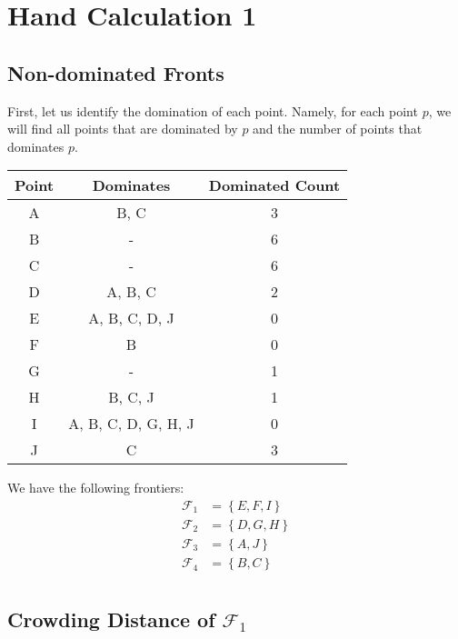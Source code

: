 \section{Hand Calculation 1}

\subsection{Non-dominated Fronts}
First, let us identify the domination of each point. Namely, for each point \(p\), we will find all points that are dominated by \(p\) and the number of points that dominates \(p\).

\begin{table}[ht]
    \centering
    \begin{tabular}{ccc}
        \toprule
        \textbf{Point} & \textbf{Dominates} & \textbf{Dominated Count} \\
        \midrule
        A & B, C & 3 \\
        B & - & 6 \\
        C & - & 6 \\
        D & A, B, C & 2\\
        E & A, B, C, D, J & 0 \\
        F & B & 0 \\
        G & - & 1 \\
        H & B, C, J & 1 \\
        I & A, B, C, D, G, H, J & 0 \\
        J & C & 3 \\
        \bottomrule
    \end{tabular}
\end{table}


We have the following frontiers:
\[
\begin{aligned}
    \mathcal{F}_1 &= \left\{E, F, I\right\} \\
    \mathcal{F}_2 &= \left\{D, G, H\right\} \\
    \mathcal{F}_3 &= \left\{A, J\right\} \\
    \mathcal{F}_4 &= \left\{B, C\right\} \\
\end{aligned}
\]

\subsection{Crowding Distance of \(\mathcal{F}_1\)}

